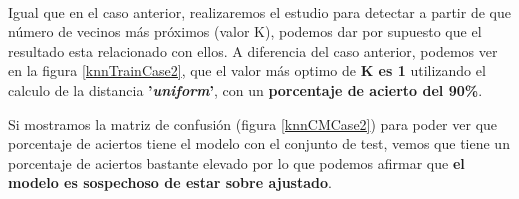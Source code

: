 \paragraph{}
Igual que en el caso anterior, realizaremos el estudio para detectar a partir de que número de vecinos más próximos (valor K), podemos dar por supuesto que el resultado esta relacionado con ellos. A diferencia del caso anterior, podemos ver en la figura \ref{knnTrainCase2}, que el valor más optimo de \textbf{K es 1} utilizando el calculo de la distancia \textbf{'\textit{uniform}'}, con un \textbf{porcentaje de acierto del 90\%}.

Si mostramos la matriz de confusión\cite{ref:confusion_matrix} (figura \ref{knnCMCase2}) para poder ver que porcentaje de aciertos tiene el modelo con el conjunto de test, vemos que tiene un porcentaje de aciertos bastante elevado por lo que podemos afirmar que \textbf{el modelo es sospechoso de estar sobre ajustado\cite{ref:knn_overfiting}}.

